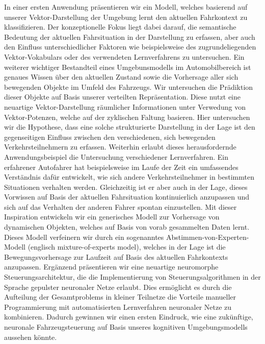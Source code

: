 In einer ersten Anwendung pr\"asentieren wir ein Modell, welches basierend auf unserer Vektor-Darstellung der Umgebung lernt den aktuellen Fahrkontext zu klassifizieren.
Der konzeptionelle Fokus liegt dabei darauf, die semantische Bedeutung der aktuellen Fahrsituation in der Darstellung zu erfassen, aber auch den Einfluss unterschiedlicher Faktoren wie beispielsweise des zugrundeliegenden Vektor-Vokabulars oder des verwendeten Lernverfahrens zu untersuchen.
Ein weiterer wichtiger Bestandteil eines Umgebunsmodells im Automobilbereich ist genaues Wissen \"uber den aktuellen Zustand sowie die Vorhersage aller sich bewegenden Objekte im Umfeld des Fahrzeugs.
Wir untersuchen die Pr\"adiktion dieser Objekte auf Basis unserer verteilten Repr\"asentation.
Diese nutzt eine neuartige Vektor-Darstellung r\"aumlicher Informationen unter Verwedung von Vektor-Potenzen, welche auf der zyklischen Faltung basieren.
Hier untersuchen wir die Hypothese, dass eine solche strukturierte Darstellung in der Lage ist den gegenseitigen Einfluss zwischen den verschiedenen, sich bewegenden Verkehrsteilnehmern zu erfassen.
Weiterhin erlaubt dieses herausfordernde Anwendungsbeispiel die Untersuchung verschiedener Lernverfahren.
Ein erfahrener Autofahrer hat beispielsweise im Laufe der Zeit ein umfassendes Verst\"andnis daf\"ur entwickelt, wie sich andere Verkehrsteilnehmer in bestimmten Situationen verhalten werden.
Gleichzeitig ist er aber auch in der Lage, dieses Vorwissen auf Basis der aktuellen Fahrsituation kontinuierlich anzupassen und sich auf das Verhalten der anderen Fahrer spontan einzustellen.
Mit dieser Inspiration entwickeln wir ein generisches Modell zur Vorhersage von dynamischen Objekten, welches auf Basis von vorab gesammelten Daten lernt.
Dieses Modell verfeinern wir durch ein sogenanntes Abstimmen-von-Experten-Modell (englisch mixture-of-experts model), welches in der Lage ist die Bewegungsvorhersage zur Laufzeit auf Basis des aktuellen Fahrkontexts anzupassen.
Erg\"anzend pr\"asentieren wir eine neuartige neuromorphe Steuerungsarchitektur, die die Implementierung von Steuerungsalgorithmen in der Sprache gepulster neuronaler Netze erlaubt.
Dies erm\"oglicht es durch die Aufteilung der Gesamtproblems in kleiner Teilnetze die Vorteile manueller Programmierung mit automatisierten Lernverfahren neuronaler Netze zu kombinieren.
Dadurch gewinnen wir einen ersten Eindruck, wie eine zuk\"unftige, neuronale Fahrzeugsteuerung auf Basis unseres kognitiven Umgebungsmodells aussehen k\"onnte.
